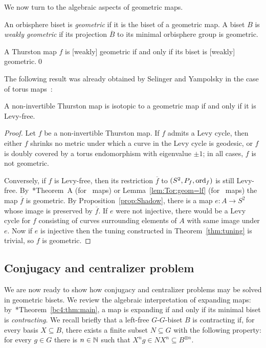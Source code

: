 \documentclass{amsart}
\begin{document}
\noindent We now turn to the algebraic aspects of geometric maps.
\begin{defn}
  An orbisphere biset is \emph{geometric} if it is the biset of a
  geometric map. A biset $B$ is \emph{weakly geometric} if its
  projection $\overline B$ to its minimal orbisphere group is
  geometric.
\end{defn}

\begin{cor}
  A Thurston map $f$ is [weakly] geometric if and only if its biset is
  [weakly] geometric.\qed
\end{cor}

The following result was already obtained by Selinger and Yampolsky in
the case of torus maps~\cite{selinger-yampolsky:geometrization}:
\begin{cor}
  A non-invertible Thurston map is isotopic to a geometric map if and
  only if it is Levy-free.
\end{cor}
\begin{proof}
  Let $f$ be a non-invertible Thurston map. If $f$ admits a Levy
  cycle, then either $f$ shrinks no metric under which a curve in the
  Levy cycle is geodesic, or $f$ is doubly covered by a torus
  endomorphism with eigenvalue $\pm1$; in all cases, $f$ is not
  geometric.

  Conversely, if $f$ is Levy-free, then its restriction $\overline f$
  to $(S^2,P_f,\operatorname{ord}_f)$ is still
  Levy-free. By~\cite{bartholdi-dudko:bc4}*{Theorem~A} (for \Exp\
  maps) or Lemma~\ref{lem:Tor:geom=lf} (for \Tor\ maps) the map
  $\overline f$ is geometric. By Proposition~\ref{prop:Shadow}, there is
  a map $e\colon A\to S^2$ whose image is preserved by $\overline
  f$. If $e$ were not injective, there would be a Levy cycle for $f$
  consisting of curves surrounding elements of $A$ with same image
  under $e$. Now if $e$ is injective then the tuning constructed in
  Theorem~\ref{thm:tuning} is trivial, so $f$ is geometric.
\end{proof}

\subsection{Conjugacy and centralizer problem}
We are now ready to show how conjugacy and centralizer problems may be
solved in geometric bisets. We review the algebraic interpretation of
expanding maps:
by~\cite{bartholdi-dudko:bc4}*{Theorem~\ref{bc4:thm:main}}, a map is
expanding if and only if its minimal biset is \emph{contracting}. We
recall briefly that a left-free $G$-$G$-biset $B$ is contracting if,
for every basis $X\subseteq B$, there exists a finite subset
$N\subseteq G$ with the following property: for every $g\in G$ there
is $n\in{\mathbb N}$ such that $X^n g\in N X^n\subseteq B^{\otimes n}$.
\end{document}

